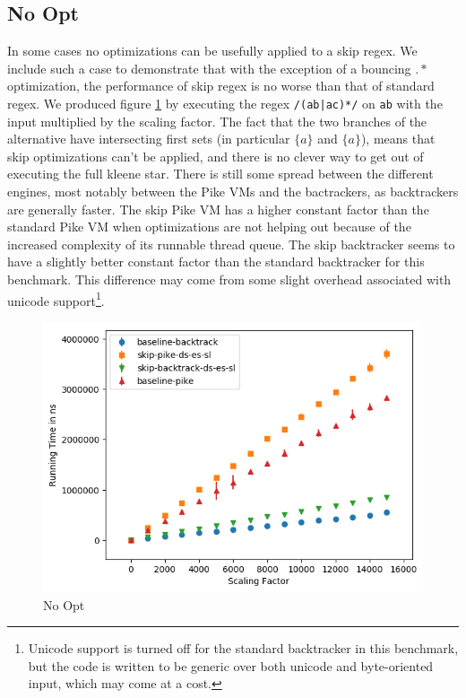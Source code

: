 \subsection{No Opt}

In some cases no optimizations can be usefully applied to a skip
regex. We include such a case to demonstrate that with the exception
of a bouncing $.*$ optimization, the performance of skip regex is
no worse than that of standard regex. We produced figure 
\ref{fig:justtwo:branch}
by executing the regex \verb'/(ab|ac)*/' on \verb'ab' with
the input multiplied by the scaling factor. The fact that the
two branches of the alternative have intersecting first sets
(in particular $\{a\}$ and $\{a\}$), means that skip optimizations
can't be applied, and there is no clever way to get out of
executing the full kleene star. There is still some spread between
the different engines, most notably between the Pike VMs and the
bactrackers, as backtrackers are generally faster. The skip Pike VM
has a higher constant factor than the standard Pike VM when optimizations
are not helping out because of the increased complexity of its runnable
thread queue. The skip backtracker seems to have a slightly better
constant factor than the standard backtracker for this benchmark.
This difference may come from some slight overhead associated with
unicode support\footnote{Unicode support is turned off for the
standard backtracker in this benchmark, but the code is written
to be generic over both unicode and byte-oriented input, which
may come at a cost.}.

\begin{figure}
\caption{No Opt}
\label{fig:justtwo:branch}

\includegraphics{resources/justtwo-branch.png}
\end{figure}

